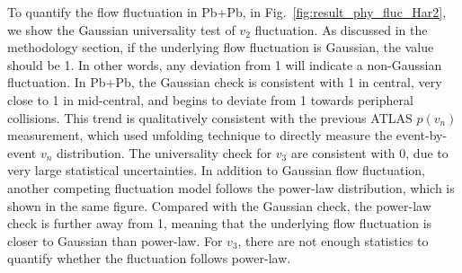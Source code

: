 To quantify the flow fluctuation in Pb+Pb, in Fig.~\ref{fig:result_phy_fluc_Har2}, we show the Gaussian universality test of $v_2$ fluctuation. As discussed in the methodology section, if the underlying flow fluctuation is Gaussian, the value should be 1. In other words, any deviation from 1 will indicate a non-Gaussian fluctuation. In Pb+Pb, the Gaussian check is consistent with 1 in central, very close to 1 in mid-central, and begins to deviate from 1 towards peripheral collisions. This trend is qualitatively consistent with the previous ATLAS $p(v_n)$ measurement, which used unfolding technique to directly measure the event-by-event $v_n$ distribution. The universality check for $v_3$ are consistent with 0, due to very large statistical uncertainties. In addition to Gaussian flow fluctuation, another competing fluctuation model follows the power-law distribution, which is shown in the same figure. Compared with the Gaussian check, the power-law check is further away from 1, meaning that the underlying flow fluctuation is closer to Gaussian than power-law. For $v_3$, there are not enough statistics to quantify whether the fluctuation follows power-law.

